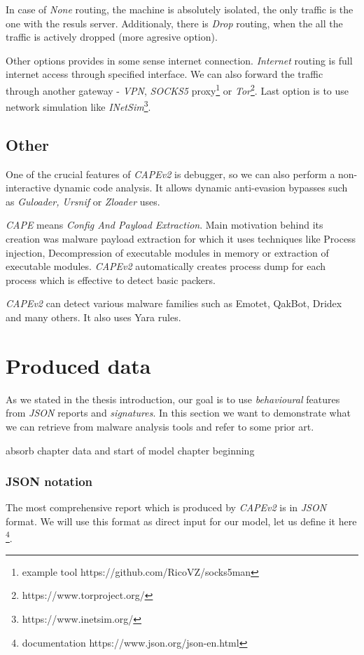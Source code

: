 In case of \emph{None} routing, the machine is absolutely isolated, the only traffic is the one with the resuls server. Additionaly, there is \emph{Drop} routing, when the all the traffic is actively dropped (more agresive option). 

Other options provides in some sense internet connection. \emph{Internet} routing is full internet access through specified interface. We can also forward the traffic through another gateway - \emph{VPN}, \emph{SOCKS5} proxy\footnote{example tool https://github.com/RicoVZ/socks5man} or \emph{Tor}\footnote{https://www.torproject.org/}. Last option is to use network simulation like \emph{INetSim}\footnote{https://www.inetsim.org/}.

\subsection{Other}
One of the crucial features of \emph{CAPEv2} is debugger, so we can also perform a non-interactive dynamic code analysis. It allows dynamic anti-evasion bypasses such as \emph{Guloader, Ursnif} or \emph{Zloader} uses.

\emph{CAPE} means \emph{Config And Payload Extraction}. Main motivation behind its creation was malware payload extraction for which it uses techniques like Process injection, Decompression of executable modules in memory or extraction of executable modules. \emph{CAPEv2} automatically creates process dump for each process which is effective to detect basic packers.

\emph{CAPEv2} can detect various malware families such as Emotet, QakBot, Dridex and many others. It also uses Yara rules.


\section{Produced data}
As we stated in the thesis introduction, our goal is to use \emph{behavioural} features from \emph{JSON} reports and \emph{signatures}. In this section we want to demonstrate what we can retrieve from malware analysis tools and refer to some prior art.

absorb chapter data and start of model chapter beginning

\subsubsection{JSON notation} \label{sec:json_notation}
The most comprehensive report which is produced by \emph{CAPEv2} is in \emph{JSON} format. We will use this format as direct input for our model, let us define it here \footnote{documentation https://www.json.org/json-en.html}.

